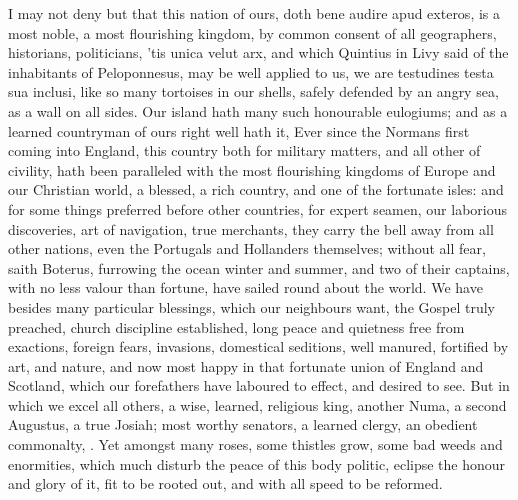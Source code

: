 {I may not deny but that this nation of ours, doth bene audire apud
exteros, is a most noble, a most flourishing kingdom, by common consent
of all geographers, historians, politicians, 'tis unica velut arx,
and which Quintius in Livy said of the inhabitants of
Peloponnesus, may be well applied to us, we are testudines testa sua
inclusi, like so many tortoises in our shells, safely defended by an
angry sea, as a wall on all sides. Our island hath many such honourable
eulogiums; and as a learned countryman of ours right well hath it,
Ever since the Normans first coming into England, this country
both for military matters, and all other of civility, hath been
paralleled with the most flourishing kingdoms of Europe and our
Christian world, a blessed, a rich country, and one of the fortunate
isles: and for some things preferred before other countries, for
expert seamen, our laborious discoveries, art of navigation, true
merchants, they carry the bell away from all other nations, even the
Portugals and Hollanders themselves; without all fear, saith
Boterus, furrowing the ocean winter and summer, and two of their
captains, with no less valour than fortune, have sailed round about the
world.  We have besides many particular blessings, which our
neighbours want, the Gospel truly preached, church discipline
established, long peace and quietness free from exactions, foreign
fears, invasions, domestical seditions, well manured, fortified by
art, and nature, and now most happy in that fortunate union of England
and Scotland, which our forefathers have laboured to effect, and
desired to see. But in which we excel all others, a wise, learned,
religious king, another Numa, a second Augustus, a true Josiah; most
worthy senators, a learned clergy, an obedient commonalty, \etc{}. Yet
amongst many roses, some thistles grow, some bad weeds and enormities,
which much disturb the peace of this body politic, eclipse the honour
and glory of it, fit to be rooted out, and with all speed to be
reformed.

}
